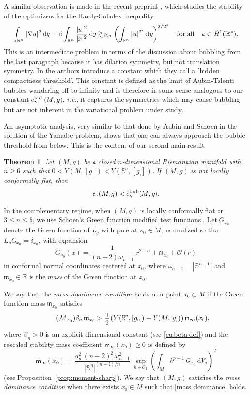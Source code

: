 \documentclass[reqno,11pt]{amsart}
\numberwithin{equation}{section}
\newtheorem{theorem}{Theorem}[section]
\theoremstyle{definition}
\theoremstyle{remark}
\newcommand{\ud}{\,\mathrm{d}}
\newcommand{\R}{\mathbb{R}}
\newcommand{\Ss}{\mathbb{S}}
\begin{document}
A similar observation is made in the recent preprint \cite{CGK2025}, which studies the stability of the optimizers for the Hardy-Sobolev 
inequality 
\[
\int_{\R^n} |\nabla u|^2 \ud y - \beta \int_{\R^n} \frac{|u|^2}{|x|^2} \ud y \gtrsim_{\beta,n} 
\left(\int_{\R^n} |u|^{2^*} \ud y\right)^{2/2^*} \quad {\rm for \ all} \quad u\in \dot{H}^1(\R^n).
\]
This is an intermediate problem
in terms of the discussion about bubbling from the last paragraph because it has dilation symmetry, but 
not translation symmetry. In \cite{CGK2025} the authors introduce a constant which they call a 'hidden 
compactness threshold'. This constant is defined as the limit of Aubin-Talenti bubbles wandering off to 
infinity and is therefore in some sense analogous to our constant $c_\gamma^{\rm bub}(M,g)$, {\it i.e.}, it 
captures the symmetries which may cause bubbling but are not inherent in the variational problem 
under study. 

An asymptotic analysis, very similar to that done by Aubin and Schoen in the solution of the 
Yamabe problem, shows that one can always approach the bubble threshold from below. This is 
the content of our second main result.

\begin{theorem}
\label{theorem c < c-bubble}
Let $(M,g)$ be a closed $n$-dimensional Riemannian manifold with $n \geqslant 6$ such 
that $0 < Y(M,[g]) < Y(\Ss^n,[g_\circ])$. If $(M,g)$ is not locally
conformally flat, then
\[
c_{\gamma}(M,g) < c_{\gamma}^{\rm bub}(M,g).
\]
\end{theorem}

In the complementary regime, when $(M,g)$ is locally conformally flat 
or $3 \leqslant n \leqslant 5$, we use Schoen's Green function modified test 
functions \cite{Sch1}. Let $G_{x_0}$ denote the Green function of $L_g$ with 
pole at $x_0 \in M$, normalized so that $L_g G_{x_0} = \delta_{x_0}$, with expansion
\begin{equation}
\label{Green function expansion}
G_{x_0}(x) = \frac{1}{(n-2)\omega_{n-1}}\, r^{2-n} + \mathfrak{m}_{x_0} + \mathcal{O}(r)
\end{equation}
in conformal normal coordinates centered at $x_0$, where $\omega_{n-1} = |\Ss^{n-1}|$ 
and $\mathfrak{m}_{x_0} \in \R$ is the \emph{mass} of the Green function at $x_0$.

We say that the \emph{mass dominance condition} holds at a point $x_0 \in M$ if
the Green function mass $\mathfrak{m}_{x_0}$ satisfies
\begin{equation}
\label{mass dominance}\tag{$\mathcal{M}_{x_0}$}
\beta_n\, \mathfrak{m}_{x_0} > \frac{\gamma}{2}\,(Y(\Ss^n,[g_\circ]) - Y(M,[g]))\, \mathsf{m}_\infty(x_0),
\end{equation}
where $\beta_n > 0$ is an explicit dimensional constant (see \eqref{eq:beta-def}) and
the rescaled stability mass coefficient $\mathsf{m}_\infty(x_0) \geqslant 0$
is defined by
\[\mathsf{m}_\infty(x_0) = \frac{\alpha_n^2\,(n-2)^2\,\omega_{n-1}^2}{|\Ss^n|^{(n-2)/n}}\,
\sup_{h \in \mathscr{O}_1} \left(\int_M h^{p-1}\, G_{x_0} \ud V_g\right)^2
\]
(see Proposition~\ref{prop:moment-sharp}).
We say that $(M,g)$ satisfies the \emph{mass dominance condition} when there exists
$x_0\in M$ such that \eqref{mass dominance} holds.
\end{document}
